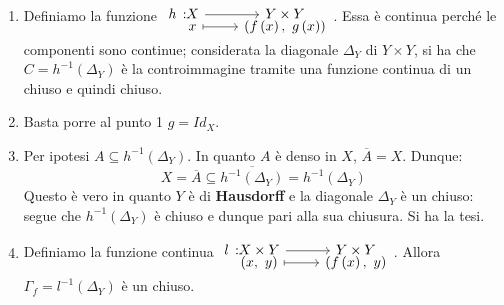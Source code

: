 \begin{demonstration}~{}
\begin{enumerate}[label=\Roman*]
\item Definiamo la funzione $\funztot{h}{X}{Y\times Y}{x}{\left(f\left(x\right),\ g\left(x\right)\right)}$. Essa è continua perché le componenti sono continue; considerata la diagonale $\Delta_{Y}$ di $Y\times Y$, si ha che $C=h^{-1}\left(\Delta_Y\right)$ è la controimmagine tramite una funzione continua di un chiuso e quindi chiuso.
\item Basta porre al punto 1 $g=Id_{X}$.
\item Per ipotesi $A\subseteq h^{-1}\left(\Delta_Y\right)$. In quanto $A$ è denso in $X$, $\overline{A}=X$. Dunque:
\begin{equation*}
X=\overline{A}\subseteq\overline{h^{-1}\left(\Delta_Y\right)}=h^{-1}\left(\Delta_Y\right)
\end{equation*}
Questo è vero in quanto $Y$ è di \textbf{Hausdorff} e la diagonale $\Delta_Y$ è un chiuso: segue che $h^{-1}\left(\Delta_Y\right)$ è chiuso e dunque pari alla sua chiusura. Si ha la tesi.
\item Definiamo la funzione continua $\funztot{l}{X\times Y}{Y\times Y}{\left(x,\ y\right)}{\left(f\left(x\right),\ y\right)}$. Allora $\Gamma_f=l^{-1}\left(\Delta_Y\right)$ è un chiuso.
\end{enumerate}
\end{demonstration}
